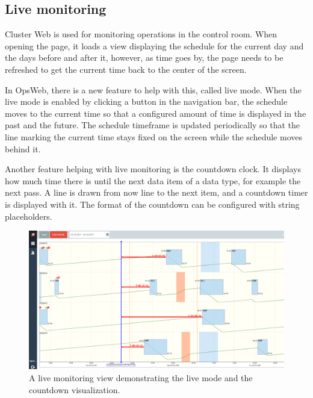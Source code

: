 \subsection{Live monitoring}
Cluster Web is used for monitoring operations in the control room. When opening the page, it loads a view displaying the schedule for the current day and the days before and after it, however, as time goes by, the page needs to be refreshed to get the current time back to the center of the screen.

In OpsWeb, there is a new feature to help with this, called live mode. When the live mode is enabled by clicking a button in the navigation bar, the schedule moves to the current time so that a configured amount of time is displayed in the past and the future. The schedule timeframe is updated periodically so that the line marking the current time stays fixed on the screen while the schedule moves behind it.

Another feature helping with live monitoring is the countdown clock. It displays how much time there is until the next data item of a data type, for example the next pass. A line is drawn from now line to the next item, and a countdown timer is displayed with it. The format of the countdown can be configured with string placeholders.

\begin{figure}[ht]
  \begin{center}
    \includegraphics*[width=1\textwidth]{new_cw_live}
  \end{center}
  \caption{A live monitoring view demonstrating the live mode and the countdown visualization.}
  \label{fig:new_cw_live}
\end{figure}

